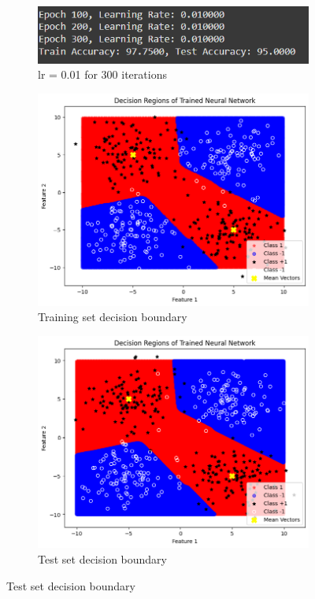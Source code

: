 \documentclass[a4paper,12pt]{article}
\begin{document}
\begin{figure}[H]
    \centering
    \captionsetup[subfigure]{list=true} %

    \begin{subfigure}{0.5\textwidth}
        \centering
        \includegraphics[width=\textwidth]{3.3_.01_300_r.png}
        \caption{lr = 0.01 for 300 iterations}
    \end{subfigure}
    \begin{subfigure}{0.45\textwidth}
        \centering
        \includegraphics[width=\textwidth]{3.3_.01_300_Train.png}
        \caption{Training set decision boundary}
    \end{subfigure}

    \begin{subfigure}{0.45\textwidth}
        \centering
        \includegraphics[width=\textwidth]{3.3_.01_300_Test.png}
        \caption{Test set decision boundary}
    \end{subfigure}


\end{figure}
\end{document}
